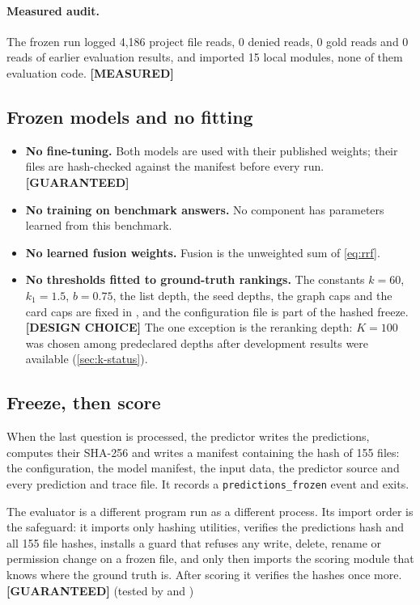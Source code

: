 \documentclass[11pt,a4paper]{article}
\newcommand{\cref}[1]{\autoref{#1}}
\theoremstyle{remark}
\newcommand{\code}[1]{\texttt{\small #1}}
\newcommand{\vtag}[2]{{\sffamily\scriptsize\bfseries\textcolor{#1}{[#2]}}}
\newcommand{\Gtag}{\vtag{accent}{GUARANTEED}}
\newcommand{\Mtag}{\vtag{measgreen}{MEASURED}}
\newcommand{\Dtag}{\vtag{black!60}{DESIGN CHOICE}}
\begin{document}
\paragraph{Measured audit.} The frozen run logged 4{,}186 project file reads, 0 denied
reads, 0 gold reads and 0 reads of earlier evaluation results, and imported 15 local
modules, none of them evaluation code. \Mtag

\subsection{Frozen models and no fitting}

\begin{itemize}
  \item \textbf{No fine-tuning.} Both models are used with their published weights; their
        files are hash-checked against the manifest before every run. \Gtag
  \item \textbf{No training on benchmark answers.} No component has parameters learned
        from this benchmark.
  \item \textbf{No learned fusion weights.} Fusion is the unweighted sum of
        \cref{eq:rrf}.
  \item \textbf{No thresholds fitted to ground-truth rankings.} The constants $k=60$,
        $k_1=1.5$, $b=0.75$, the list depth, the seed depths, the graph caps and the card
        caps are fixed in , and the configuration file is part of the
        hashed freeze. \Dtag{} The one exception is the reranking depth: $K=100$ was
        chosen among predeclared depths after development results were available
        (\cref{sec:k-status}).
\end{itemize}

\subsection{Freeze, then score}

When the last question is processed, the predictor writes the predictions, computes their
SHA-256 and writes a manifest containing the hash of 155 files: the configuration, the
model manifest, the input data, the predictor source and every prediction and trace file.
It records a \code{predictions\_frozen} event and exits.

The evaluator is a different program run as a different process. Its import order is the
safeguard: it imports only hashing utilities, verifies the predictions hash and all 155
file hashes, installs a guard that refuses any write, delete, rename or permission change
on a frozen file, and only then imports the scoring module that knows where the ground
truth is. After scoring it verifies the hashes once more. \Gtag{} (tested by
 and
)
\end{document}
